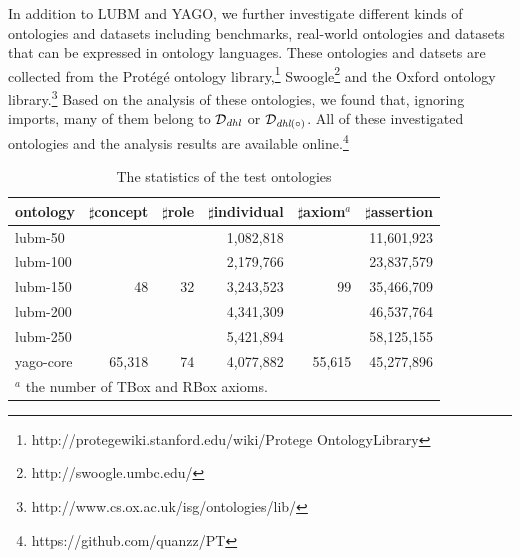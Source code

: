In addition to LUBM and YAGO, we further investigate different kinds of ontologies and datasets
including benchmarks, real-world ontologies and datasets that can be
expressed in ontology languages.
These ontologies and datsets are collected from the Prot\'{e}g\'{e}
ontology
library,\footnote{http://protegewiki.stanford.edu/wiki/Protege\textunderscore
  Ontology\textunderscore Library}
Swoogle\footnote{http://swoogle.umbc.edu/} and the Oxford ontology library.\footnote{http://www.cs.ox.ac.uk/isg/ontologies/lib/}
Based on the analysis of these ontologies, we found that, ignoring imports, many of them
belong to $\mathcal{D}_{\textit{\text{dhl}}}$ or $\mathcal{D}_{\textit{\text{dhl}}(\circ)}$.
All of these investigated ontologies and the analysis results are available online.\footnote{https://github.com/quanzz/PT}

\begin{table}
\centering
\caption{The statistics of the test ontologies}
\begin{tabular}{|l|r|r|r|r|r|}
\hline
ontology&$\sharp$concept&$\sharp$role&$\sharp$individual&$\sharp$axiom$^{a}$&$\sharp$assertion\\
\hline
lubm-50&\multirow{5}{*}{48}&\multirow{5}{*}{32}&1,082,818&\multirow{5}{*}{99}&11,601,923\\
lubm-100&&&2,179,766&&23,837,579\\
lubm-150&&&3,243,523&&35,466,709\\
lubm-200&&&4,341,309&&46,537,764\\
lubm-250&&&5,421,894&&58,125,155\\
\hline
yago-core&65,318&74&4,077,882&55,615&45,277,896\\
\hline
\multicolumn{5}{l}{$^{a}$ \small the number of TBox and RBox axioms.}\\
\end{tabular}
\label{tab:onto}
\end{table}

